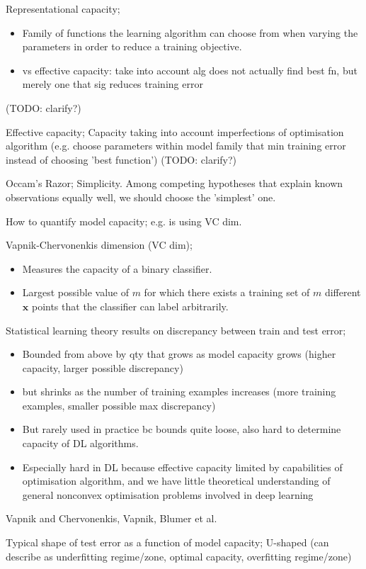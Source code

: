 \documentclass{article}
\begin{document}
Representational capacity; \begin{itemize} \item Family of functions the learning algorithm can choose from when varying the parameters in order to reduce a training objective.  \item vs effective capacity: take into account alg does not actually find best fn, but merely one that sig reduces training error \end{itemize} (TODO: clarify?)

Effective capacity; Capacity taking into account imperfections of optimisation algorithm (e.g. choose parameters within model family that min training error instead of choosing 'best function') (TODO: clarify?)

Occam's Razor; Simplicity. Among competing hypotheses that explain known observations equally well, we should choose the 'simplest' one.

How to quantify model capacity; e.g. is using VC dim.

Vapnik-Chervonenkis dimension (VC dim); \begin{itemize} \item Measures the capacity of a binary classifier.  \item Largest possible value of $m$ for which there exists a training set of $m$ different $\mathbf{x}$ points that the classifier can label arbitrarily.  \end{itemize}

Statistical learning theory results on discrepancy between train and test error; \begin{itemize} \item Bounded from above by qty that grows as model capacity grows (higher capacity, larger possible discrepancy) \item but shrinks as the number of training examples increases (more training examples, smaller possible max discrepancy) \item But rarely used in practice bc bounds quite loose, also hard to determine capacity of DL algorithms.  \item Especially hard in DL because effective capacity limited by capabilities of optimisation algorithm, and we have little theoretical understanding of general nonconvex optimisation problems involved in deep learning \end{itemize} Vapnik and Chervonenkis, Vapnik, Blumer et al.

Typical shape of test error as a function of model capacity; U-shaped (can describe as underfitting regime/zone, optimal capacity, overfitting regime/zone)
\end{document}
